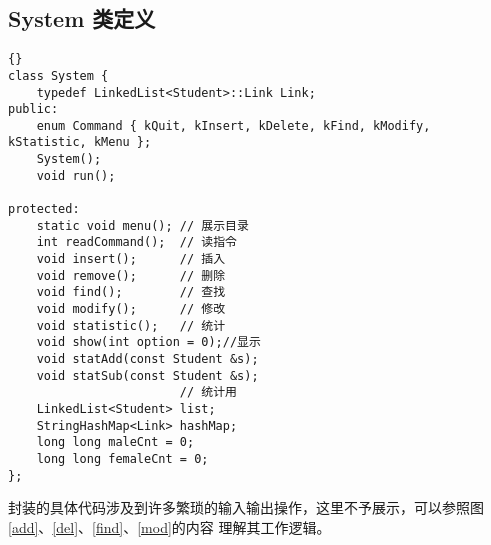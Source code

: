 \subsection{System 类定义}
\begin{lstlisting}[firstnumber=986, caption=System 类定义]{}
class System {
    typedef LinkedList<Student>::Link Link;
public:
    enum Command { kQuit, kInsert, kDelete, kFind, kModify, kStatistic, kMenu };
    System();
    void run();

protected:
    static void menu(); // 展示目录
    int readCommand();  // 读指令
    void insert();      // 插入
    void remove();      // 删除
    void find();        // 查找
    void modify();      // 修改
    void statistic();   // 统计
    void show(int option = 0);//显示
    void statAdd(const Student &s);
    void statSub(const Student &s);
                        // 统计用
    LinkedList<Student> list;
    StringHashMap<Link> hashMap;
    long long maleCnt = 0;
    long long femaleCnt = 0;
};
\end{lstlisting}

封装的具体代码涉及到许多繁琐的输入输出操作，这里不予展示，可以参照图\ref{add}、\ref{del}、\ref{find}、\ref{mod}的内容%
理解其工作逻辑。